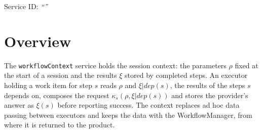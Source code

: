 \documentclass[a4paper]{arrowhead}
\begin{document}
\ArrowheadSetup

\begin{center}
  \vspace*{1cm}
  \huge{\arrowtitle}

  \vspace*{0.2cm}
  \LARGE{\arrowtype}
  \vspace*{1cm}

  \Large{Service ID: \textit{``\arrowid''}}
  \vspace*{\fill}

  

  \vspace*{1cm}
  \vspace*{\fill}

  \begin{abstract}
    This document describes the \texttt{workflow\allowbreak{}Context} service of the Eclipse Arrowhead workflow support systems, which gives executors the session parameters and the results their step may read, and stores step results. It is provided by the WorkflowManager system, service version 1.0.0, documentation edition 5.4.0.
  \end{abstract}

  \vspace*{1cm}
\end{center}

\newpage

\tableofcontents
\newpage

\section{Overview}
\label{sec:overview}
The \texttt{workflow\allowbreak{}Context} service holds the session context: the parameters $\rho$ fixed at the
start of a session and the results $\xi$ stored by completed steps. An executor holding a work item for step $s$ reads
$\rho$ and $\xi|dep(s)$, the results of the steps $s$ depends on, composes the request $\kappa_s(\rho, \xi|dep(s))$ and
stores the provider's answer as $\xi(s)$ before reporting success. The context replaces ad hoc data passing between
executors and keeps the data with the WorkflowManager, from where it is returned to the product.
\end{document}
